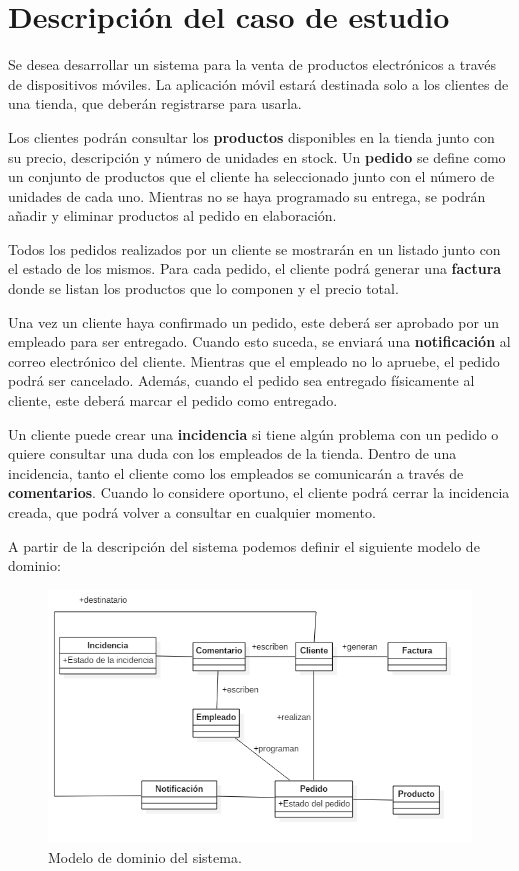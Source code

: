 \documentclass[11pt,spanish,listoffigures]{tfgetsinf}
\begin{document}
\section{Descripción del caso de estudio}

Se desea desarrollar un sistema para la venta de productos electrónicos a través de dispositivos móviles. La aplicación móvil estará destinada solo a los clientes de una tienda, que deberán registrarse para usarla.

Los clientes podrán consultar los \textbf{productos} disponibles en la tienda junto con su precio, descripción y número de unidades en stock. Un \textbf{pedido} se define como un conjunto de productos que el cliente ha seleccionado junto con el número de unidades de cada uno. Mientras no se haya programado su entrega, se podrán añadir y eliminar productos al pedido en elaboración.

Todos los pedidos realizados por un cliente se mostrarán en un listado junto con el estado de los mismos. Para cada pedido, el cliente podrá generar una \textbf{factura} donde se listan los productos que lo componen y el precio total.

Una vez un cliente haya confirmado un pedido, este deberá ser aprobado por un empleado para ser entregado. Cuando esto suceda, se enviará una \textbf{notificación} al correo electrónico del cliente. Mientras que el empleado no lo apruebe, el pedido podrá ser cancelado. Además, cuando el pedido sea entregado físicamente al cliente, este deberá marcar el pedido como entregado.

Un cliente puede crear una \textbf{incidencia} si tiene algún problema con un pedido o quiere consultar una duda con los empleados de la tienda. Dentro de una incidencia, tanto el cliente como los empleados se comunicarán a través de \textbf{comentarios}. Cuando lo considere oportuno, el cliente podrá cerrar la incidencia creada, que podrá volver a consultar en cualquier momento.

A partir de la descripción del sistema podemos definir el siguiente modelo de dominio:

\begin{figure}[h]
\centering
\includegraphics[scale=0.5]{modelo_dominio_final}
\caption{Modelo de dominio del sistema.}
\end{figure}
\end{document}
